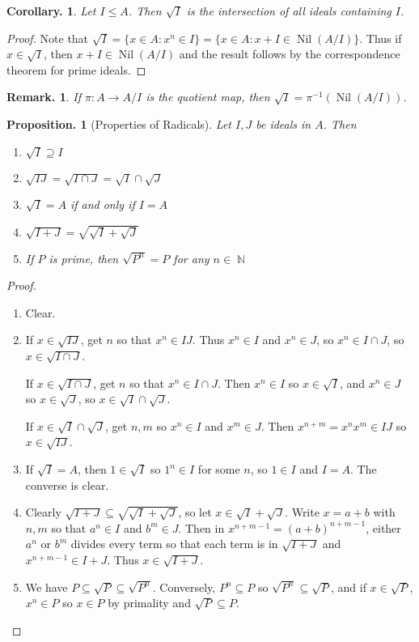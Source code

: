 \documentclass[11pt, a4paper]{memoir}
\DeclareMathOperator{\N}{{\mathbb{N}}}
\theoremstyle{change}
\newtheorem{corollary}[theorem]{Corollary.}
\newtheorem{proposition}[theorem]{Proposition.}
\theoremstyle{plain}
\theoremstyle{nonumberplain}
\newtheorem{remark}{Remark.}
\newtheorem{proof}{Proof}
\DeclareMathOperator{\Nil}{Nil}
\numberwithin{equation}{section}
\begin{document}
\begin{corollary}
    Let $I\leq A$.
    Then $\sqrt{I}$ is the intersection of all ideals containing $I$.
\end{corollary}
\begin{proof}
    Note that $\sqrt{I}=\{x\in A:x^n\in I\}=\{x\in A:x+I\in\Nil(A/I)\}$.
    Thus if $x\in\sqrt{I}$, then $x+I\in\Nil(A/I)$ and the result follows by the correspondence theorem for prime ideals.
\end{proof}
\begin{remark}
    If $\pi:A\to A/I$ is the quotient map, then $\sqrt{I}=\pi^{-1}(\Nil(A/I))$.
\end{remark}
\begin{proposition}[Properties of Radicals]
    Let $I,J$ be ideals in $A$.
    Then
    \begin{enumerate}[nl,r]
        \item $\sqrt{I}\supseteq I$
        \item $\sqrt{IJ}=\sqrt{I\cap J}=\sqrt{I}\cap\sqrt{J}$
        \item $\sqrt{I}=A$ if and only if $I=A$
        \item $\sqrt{I+J}=\sqrt{\sqrt{I}+\sqrt{J}}$
        \item If $P$ is prime, then $\sqrt{P^n}=P$ for any $n\in\N$
    \end{enumerate}
\end{proposition}
\begin{proof}
    \begin{enumerate}[nl]
        \item Clear.
        \item If $x\in\sqrt{IJ}$, get $n$ so that $x^n\in IJ$.
            Thus $x^n\in I$ and $x^n\in J$, so $x^n\in I\cap J$, so $x\in\sqrt{I\cap J}$.

            If $x\in\sqrt{I\cap J}$, get $n$ so that $x^n\in I\cap J$.
            Then $x^n\in I$ so $x\in\sqrt{I}$, and $x^n\in J$ so $x\in\sqrt{J}$, so $x\in\sqrt{I}\cap\sqrt{J}$.

            If $x\in\sqrt{I}\cap\sqrt{J}$, get $n,m$ so $x^n\in I$ and $x^m\in J$.
            Then $x^{n+m}=x^{n}x^{m}\in IJ$ so $x\in\sqrt{IJ}$.
        \item If $\sqrt{I}=A$, then $1\in\sqrt{I}$ so $1^n\in I$ for some $n$, so $1\in I$ and $I=A$.
            The converse is clear.
        \item Clearly $\sqrt{I+J}\subseteq\sqrt{\sqrt{I}+\sqrt{J}}$, so let $x\in\sqrt{I}+\sqrt{J}$.
            Write $x=a+b$ with $n,m$ so that $a^n\in I$ and $b^m\in J$.
            Then in $x^{n+m-1}=(a+b)^{n+m-1}$, either $a^n$ or $b^m$ divides every term so that each term is in $\sqrt{I+J}$ and $x^{n+m-1}\in I+J$.
            Thus $x\in\sqrt{I+J}$.
        \item We have $P\subseteq\sqrt{P}\subseteq\sqrt{P^n}$.
            Conversely, $P^n\subseteq P$ so $\sqrt{P^n}\subseteq\sqrt{P}$, and if $x\in\sqrt{P}$, $x^n\in P$ so $x\in P$ by primality and $\sqrt{P}\subseteq P$.
    \end{enumerate}
\end{proof}
\end{document}
